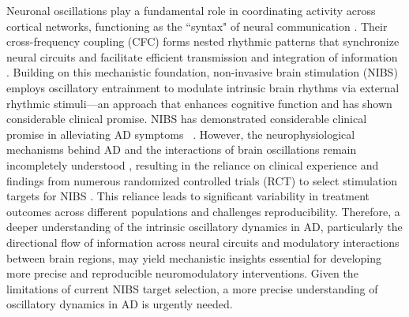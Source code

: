 \documentclass[lettersize,journal]{IEEEtran}
\begin{document}
Neuronal oscillations play a fundamental role in coordinating activity across cortical networks, functioning as the ``syntax" of neural communication   \cite{myrov2024rhythmicity, buzsaki2023brain}.
Their cross-frequency coupling (CFC) forms nested rhythmic patterns that synchronize neural circuits and facilitate efficient transmission and integration of information   \cite{bonnefond2017communication}.
Building on this mechanistic foundation, non-invasive brain stimulation (NIBS) employs oscillatory entrainment to modulate intrinsic brain rhythms via external rhythmic stimuli—an approach that enhances cognitive function and has shown considerable clinical promise. NIBS has demonstrated considerable clinical promise in alleviating AD symptoms~  \cite{thut2011rhythmic, stein2020transcranial}.
However, the neurophysiological mechanisms behind AD and the interactions of brain oscillations remain incompletely understood   \cite{fusar2021preventive}, resulting in the reliance on clinical experience and findings from numerous randomized controlled trials (RCT) to select stimulation targets for NIBS   \cite{young2023agile}. This reliance leads to significant variability in treatment outcomes across different populations and challenges reproducibility.
Therefore, a deeper understanding of the intrinsic oscillatory dynamics in AD, particularly the directional flow of information across neural circuits and modulatory interactions between brain regions, may yield mechanistic insights essential for developing more precise and reproducible neuromodulatory interventions. Given the limitations of current NIBS target selection, a more precise understanding of oscillatory dynamics in AD is urgently needed.
\end{document}
